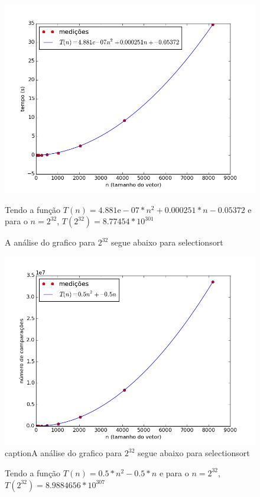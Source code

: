\documentclass[12pt,a4paper,twoside]{report}
\begin{document}


\begin{figure}[ht]
\centering \includegraphics[scale=0.8]{../selectionsort/imagens/selectionsortQuaseDecresc100.png}
\caption{A análise do grafico para $2^{32}$ segue abaixo para selectionsort}

Tendo a função $T(n) = 4.881\mathrm{e}-07*n^{2}+0.000251*n-0.05372$ e para o $n =2^{32}$, $T(2^{32}) = 8.77454*10^{301}$
\label{fig:selectionsortQuaseDecresc100}
\end{figure}

\begin{figure}[ht]
\centering \includegraphics[scale=0.8]{../selectionsort/imagens/selectionsortQuaseDecresc101.png}
\\caption{A análise do grafico para $2^{32}$ segue abaixo para selectionsort}

Tendo a função $T(n) = 0.5*n^{2}-0.5*n$ e para o $n =2^{32}$, $T(2^{32}) =8.9884656 * 10^{307}$
\label{fig:selectionsortQuaseDecresc101}
\end{figure}
\end{document}
